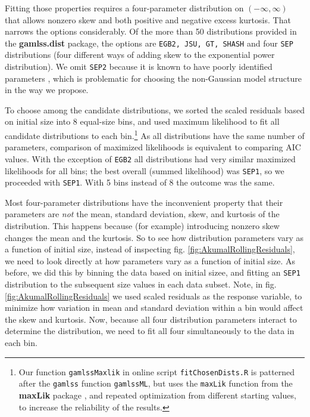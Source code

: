 \documentclass[12pt]{article}
\begin{document}
Fitting those properties requires a four-parameter distribution on $(-\infty, \infty)$ that allows nonzero skew and both 
positive and negative excess kurtosis. That narrows the options considerably. 
Of the more than 50 distributions provided in the \textbf{gamlss.dist} package, the options are 
\texttt{EGB2, JSU, GT, SHASH} and four \texttt{SEP} distributions (four different ways of adding skew to the
exponential power distribution). We omit \texttt{SEP2} because it is known to have poorly identified parameters
\citep{diciccio-monti-2004}, which is problematic for choosing the non-Gaussian model structure in the way we propose.   

To choose among the candidate distributions, we sorted the scaled residuals based on initial size into 8 equal-size bins, 
and used maximum likelihood to fit all candidate distributions to each bin.\footnote{Our function \texttt{gamlssMaxlik} 
in online script \texttt{fitChosenDists.R} is
patterned after the \texttt{gamlss} function \texttt{gamlssML}, but uses the \texttt{maxLik} function from the \textbf{maxLik}
package \citep{maxLik-package}, and repeated optimization from different starting values, to increase the reliability of the results.} 
As all distributions have the same number of parameters, comparison of maximized likelihoods is equivalent to comparing AIC values. 
With the exception of \texttt{EGB2} all distributions had very similar maximized likelihoods for all bins; the best overall (summed
likelihood) was \texttt{SEP1}, so we proceeded with \texttt{SEP1}. With 5 bins instead of 8 the outcome was the same. 

Most four-parameter distributions have the inconvenient property that their parameters are \emph{not} the mean, standard deviation, skew,
and kurtosis of the distribution. This happens because (for example) introducing nonzero skew changes the mean and the kurtosis. 
So to see how distribution parameters vary as a function of initial size, instead of inspecting fig. \ref{fig:AkumalRollingResiduals}, we need
to look directly at how parameters vary as a function of initial size. As before, we did this by binning the data based on initial sizee, 
and fitting an \texttt{SEP1} distribution to the subsequent size values in each data subset. Note, 
in fig. \ref{fig:AkumalRollingResiduals} we used scaled residuals as the response variable, 
to minimize how variation in mean and standard deviation within a bin would affect the skew and kurtosis. 
Now, because all four distribution parameters interact to determine the distribution, we need to fit all 
four simultaneously to the data in each bin. 
\end{document}
